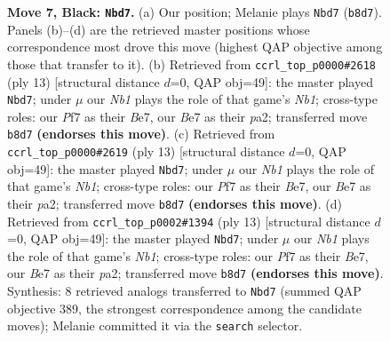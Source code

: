 \documentclass[11pt]{article}
\begin{document}
\begin{figure}[p]
\caption{\textbf{Move 7, Black: \texttt{Nbd7}.} (a) Our position; Melanie plays \texttt{Nbd7} (\texttt{b8d7}). Panels (b)--(d) are the retrieved master positions whose correspondence most drove this move (highest QAP objective among those that transfer to it). (b) Retrieved from \texttt{ccrl\_top\_p0000\#2618} (ply 13) [structural distance $d$=0, QAP obj=49]: the master played \texttt{Nbd7}; under $\mu$ our \emph{Nb1} plays the role of that game's \emph{Nb1}; cross-type roles: our \emph{P}f7 as their \emph{B}e7, our \emph{B}e7 as their \emph{p}a2; transferred move \texttt{b8d7} \textbf{(endorses this move)}. (c) Retrieved from \texttt{ccrl\_top\_p0000\#2619} (ply 13) [structural distance $d$=0, QAP obj=49]: the master played \texttt{Nbd7}; under $\mu$ our \emph{Nb1} plays the role of that game's \emph{Nb1}; cross-type roles: our \emph{P}f7 as their \emph{B}e7, our \emph{B}e7 as their \emph{p}a2; transferred move \texttt{b8d7} \textbf{(endorses this move)}. (d) Retrieved from \texttt{ccrl\_top\_p0002\#1394} (ply 13) [structural distance $d$=0, QAP obj=49]: the master played \texttt{Nbd7}; under $\mu$ our \emph{Nb1} plays the role of that game's \emph{Nb1}; cross-type roles: our \emph{P}f7 as their \emph{B}e7, our \emph{B}e7 as their \emph{p}a2; transferred move \texttt{b8d7} \textbf{(endorses this move)}. Synthesis: 8 retrieved analogs transferred to \texttt{Nbd7} (summed QAP objective 389, the strongest correspondence among the candidate moves); Melanie committed it via the \texttt{search} selector.}
\label{fig:thought-m13}
\end{figure}

\clearpage
\end{document}
